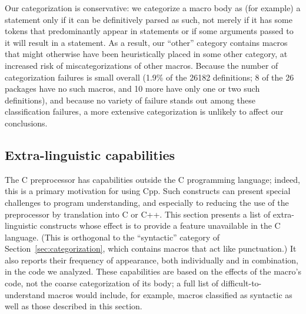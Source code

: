 \documentclass[10pt]{article}
\def\numpackages{26}
\def\nummacrodefs{26182}        %
\begin{document}
\begin{description}
  Our categorization is conservative:
  we categorize a macro body as (for example) a statement only if it can be
  definitively parsed as such, not merely if it has some tokens that
  predominantly appear in statements or if some arguments passed to it will
  result in a statement.  As a result, our ``other'' category contains
  macros that might otherwise have been heuristically placed in some other category, at
  increased risk of miscategorizations of other macros.  Because the number
  of categorization failures is small overall (1.9\% of the {\nummacrodefs}
  definitions; 8 of the {\numpackages} packages have no such macros, and 10
  more have only one or two such definitions), and because no variety of
  failure stands out among these classification failures, a more extensive
  categorization is unlikely to affect our conclusions.

\end{description}







\subsection{Extra-linguistic capabilities}
\label{sec:extra-linguistic}

The C preprocessor has capabilities outside the C programming language;
indeed, this is a primary motivation for using Cpp.  Such constructs can
present special challenges to program understanding, and especially to
reducing the use of the preprocessor by translation into C or C++.  This
section presents a list of extra-linguistic constructs whose effect is to
provide a feature unavailable in the C language.  (This is orthogonal to
the ``syntactic'' category of Section~\ref{sec:categorization}, which
contains macros that act like punctuation.)  It also reports their
frequency of appearance, both individually and in combination, in the code
we analyzed.
These capabilities are based on the effects of the macro's code,
not the coarse categorization of its body; a full list of
difficult-to-understand macros would include, for example, macros classified as
syntactic as well as those described in this section.
\end{document}
